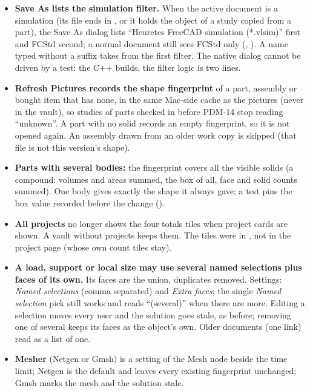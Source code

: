 \begin{itemize}[nosep]
  \item \textbf{Save As lists the simulation filter.} When the active document is a simulation (its file ends in
        , or it holds the  object of a study copied from a part), the Save As
        dialog lists ``Heuretes FreeCAD simulation (*.vlsim)'' first and FCStd second; a normal document still sees
        FCStd only (, ). A name typed without a suffix takes
         from the first filter. The native dialog cannot be driven by a test: the C++ builds, the
        filter logic is two lines.
  \item \textbf{Refresh Pictures records the shape fingerprint} of a part, assembly or bought item that has none, in
        the same Mac-side cache as the pictures (never in the vault), so studies of parts checked in before PDM-14
        stop reading ``unknown''. A part with no solid records an empty fingerprint, so it is not opened again.
        An assembly drawn from an older work copy is skipped (that file is not this version's shape).
  \item \textbf{Parts with several bodies:} the fingerprint covers all the visible solids (a compound: volumes and
        areas summed, the box of all, face and solid counts summed). One body gives exactly the shape it always gave;
        a test pins the box value recorded before the change ().
  \item \textbf{All projects} no longer shows the four totals tiles when project cards are shown. A vault without
        projects keeps them. The tiles were in , not in the project page (whose own
        count tiles stay).
  \item \textbf{A load, support or local size may use several named selections plus faces of its own.} Its faces
        are the union, duplicates removed. Settings: \emph{Named selections} (comma separated) and \emph{Extra
        faces}; the single \emph{Named selection} pick still works and reads ``(several)'' when there are more.
        Editing a selection moves every user and the solution goes stale, as before; removing one of several keeps
        its faces as the object's own. Older documents (one  link) read as a list of one.
  \item \textbf{Mesher} (Netgen or Gmsh) is a setting of the Mesh node beside the time limit; Netgen is the
        default and leaves every existing fingerprint unchanged; Gmsh marks the mesh and the solution stale.
\end{itemize}

